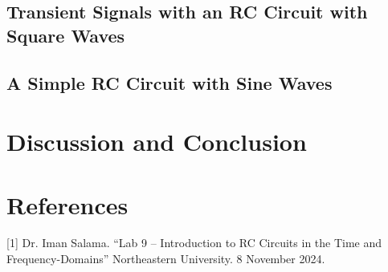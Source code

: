 \documentclass[12pt]{article}
\begin{document}
\subsection{Transient Signals with an RC Circuit with Square Waves} \label{subsec:part 1}


\subsection{A Simple RC Circuit with Sine Waves} \label{subsec:part 2}

\section{Discussion and Conclusion}
\section{References}
 [1] Dr. Iman Salama. “Lab 9 – Introduction to RC Circuits in the Time and Frequency-Domains” Northeastern University. 8 November 2024.
\end{document}
